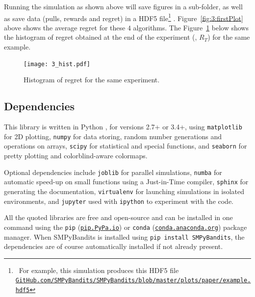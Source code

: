 Running the simulation as shown above will save figures in a sub-folder, as well as save data (pulls, rewards and regret) in a HDF5 file\footnote{~For example, this simulation produces this HDF5 file\\\texttt{\href{https://github.com/SMPyBandits/SMPyBandits/blob/master/plots/paper/example.hdf5}{GitHub.com/SMPyBandits/SMPyBandits/blob/master/plots/paper/example.hdf5}}}
\cite{h5py}.
Figure~\ref{fig:3:firstPlot} above shows the average regret for these $4$ algorithms.
The Figure~\ref{fig:3:firstPlot_hist} below shows the histogram of regret obtained at the end of the experiment (\ie, $R_T$) for the same example.

\begin{figure}[h!]  %
	\texttt{[image: 3\_hist.pdf]}
	\caption{Histogram of regret for the same experiment.}
	\label{fig:3:firstPlot_hist}
\end{figure}


\subsection{Dependencies}
\label{sub:3:dependencies}

This library is written in Python \cite{python}, for versions 2.7+ or 3.4+, using \texttt{matplotlib} \cite{matplotlib} for 2D plotting, \texttt{numpy} \cite{numpy} for data storing, random number generations and operations on arrays, \texttt{scipy} \cite{scipy} for statistical and special functions, and \texttt{seaborn} \cite{seaborn} for pretty plotting and colorblind-aware colormaps.

Optional dependencies include \texttt{joblib} \cite{joblib} for parallel simulations, \texttt{numba} \cite{numba} for automatic speed-up on small functions using a Just-in-Time compiler, \texttt{sphinx} \cite{sphinx} for generating the documentation, \texttt{virtualenv} \cite{virtualenv} for launching simulations in isolated environments, and \texttt{jupyter} \cite{jupyter} used with \texttt{ipython} \cite{ipython} to experiment with the code.

All the quoted libraries are free and open-source and can be installed in one command using the \texttt{pip} (\texttt{\href{https://pip.pypa.io/}{pip.PyPa.io}}) or \texttt{conda} (\texttt{\href{http://conda.anaconda.org/}{conda.anaconda.org}}) package manager.
%
When SMPyBandits is installed using \texttt{pip install SMPyBandits}, the dependencies are of course automatically installed if not already present.



